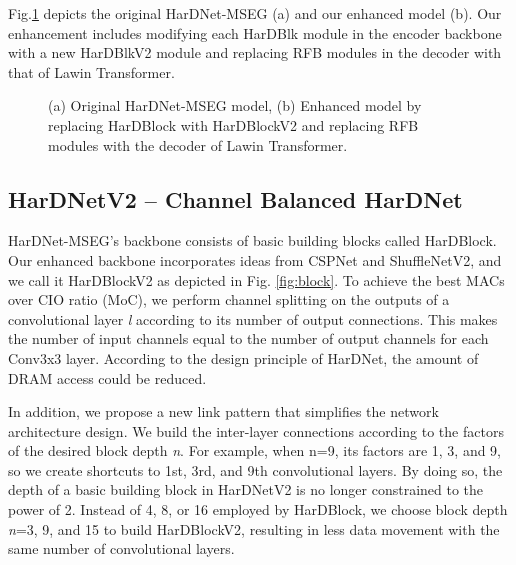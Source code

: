 \documentclass[runningheads]{llncs}
\begin{document}
  Fig.\ref{fig:mseg} depicts the original HarDNet-MSEG (a) and
  our enhanced model (b).
  Our enhancement includes modifying each HarDBlk module
  in the encoder backbone with a new HarDBlkV2 module and
  replacing RFB modules in the decoder with that of Lawin Transformer\cite{lawin}.
  
\begin{figure}[!ht]
    \centering
    \hspace{1pt}
    \centering
\caption{(a) Original HarDNet-MSEG model, (b) Enhanced model by replacing HarDBlock with HarDBlockV2 and replacing RFB modules with the decoder of Lawin Transformer.}
    \label{fig:mseg}
    \vspace{-0.5cm}
\end{figure}


\subsection{HarDNetV2 -- Channel Balanced HarDNet}

HarDNet-MSEG's backbone consists of basic building blocks called HarDBlock.
  Our enhanced backbone incorporates ideas
  from CSPNet and ShuffleNetV2,
  and we call it HarDBlockV2 as depicted in Fig. \ref{fig:block}.
  To achieve the best MACs over CIO ratio (MoC),
  we perform channel splitting on
  the outputs of a convolutional layer \textit{l}
  according to its number of output connections.
  This makes the number of input channels equal to
  the number of output channels for each Conv3x3 layer.
  According to the design principle of HarDNet,
  the amount of DRAM access could be reduced.
  


  In addition, we propose a new link pattern
  that simplifies the network architecture design.
  We build the inter-layer connections according to the factors of
  the desired block depth \textit{n}.
  For example, when n=9, its factors are 1, 3, and 9,
  so we create shortcuts to 1st, 3rd, and 9th convolutional layers.
  By doing so, the depth of a basic building block in HarDNetV2 is
  no longer constrained to the power of 2.
  Instead of 4, 8, or 16 employed by HarDBlock, 
  we choose block depth\textit{ n}=3, 9, and 15
  to build HarDBlockV2,
  resulting in less data movement with the same number of convolutional layers.
  
\end{document}
